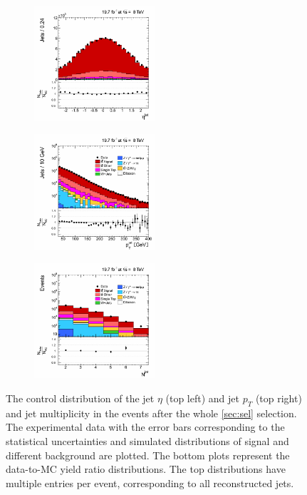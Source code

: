  \begin{figure}[h]
 \centering
 \begin{subfigure}
   \centering
   \includegraphics[width=0.49\textwidth]{04_event_reconstruction/plots/basic_jet_eta_step7.png}
 \end{subfigure}
 \begin{subfigure}
   \centering
   \includegraphics[width=0.49\textwidth]{04_event_reconstruction/plots/basic_jet_pt_step7.png}
 \end{subfigure}
  \begin{subfigure}
   \centering
   \includegraphics[width=0.49\textwidth]{04_event_reconstruction/plots/basic_jet_multiplicity_step7.png}
 \end{subfigure}
 \caption{The control distribution of the jet $\eta$ (top left) and jet $p_{T}$ (top right) and jet multiplicity in the events 
 after the whole \ref{sec:sel} selection. The experimental data with the error bars corresponding to the statistical uncertainties
 and simulated distributions of signal and different background are plotted. The bottom plots represent the data-to-MC yield ratio distributions. 
 The top distributions have multiple entries per event, corresponding to all reconstructed jets.}
 \label{fig:CPjetskin}
 \end{figure}
 
